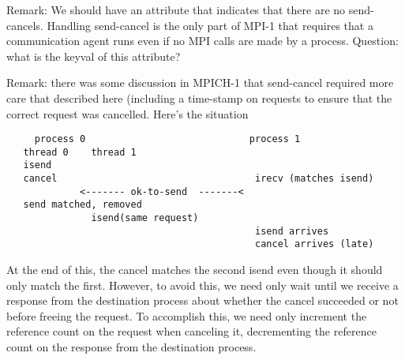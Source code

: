 \documentclass{article}
\begin{document}
Remark: We should have an attribute that indicates that there
are no send-cancels.  Handling send-cancel is the only part of MPI-1
that requires that a communication agent runs even if no MPI calls are
made by a process.  Question: what is the keyval of this attribute?

Remark: there was some discussion in MPICH-1 that send-cancel required more
care that described here (including a time-stamp on requests to ensure
that the correct request was cancelled.  Here's the situation
\begin{verbatim}
     process 0                             process 1
   thread 0    thread 1                
   isend 
   cancel                                   irecv (matches isend)
             <------- ok-to-send  -------<
   send matched, removed
               isend(same request)
                                            isend arrives
                                            cancel arrives (late)
\end{verbatim}
At the end of this, the cancel matches the second isend even though it
should only match the first.  However, to avoid this, we need only
wait until we receive a response from the destination process about
whether the cancel succeeded or not before freeing the request.  To
accomplish this, we need only increment the reference count on the
request when canceling it, decrementing the reference count on the
response from the destination process.


\subsubsection{}
\end{document}
